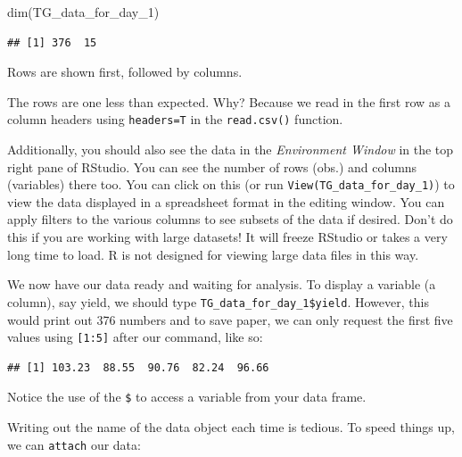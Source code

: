 \documentclass[
]{book}
\makeatletter
\newenvironment{Shaded}{\begin{snugshade}}{\end{snugshade}}
\newcommand{\DecValTok}[1]{\textcolor[rgb]{0.00,0.00,0.81}{#1}}
\newcommand{\FunctionTok}[1]{\textcolor[rgb]{0.00,0.00,0.00}{#1}}
\newcommand{\NormalTok}[1]{#1}
\newcommand{\SpecialCharTok}[1]{\textcolor[rgb]{0.00,0.00,0.00}{#1}}
\newenvironment{kframe}{%
\medskip{}
\setlength{\fboxsep}{.8em}
 \def\at@end@of@kframe{}%
 \ifinner\ifhmode%
  \def\at@end@of@kframe{\end{minipage}}%
  \begin{minipage}{\columnwidth}%
 \fi\fi%
 \def\FrameCommand##1{\hskip\@totalleftmargin \hskip-\fboxsep
 \colorbox{shadecolor}{##1}\hskip-\fboxsep
     \hskip-\linewidth \hskip-\@totalleftmargin \hskip\columnwidth}%
 \MakeFramed {\advance\hsize-\width
   \@totalleftmargin\z@ \linewidth\hsize
   \@setminipage}}%
 {\par\unskip\endMakeFramed%
 \at@end@of@kframe}
\newenvironment{rmdblock}[1]
  {
  \begin{itemize}
  \renewcommand{\labelitemi}{
    \raisebox{-.7\height}[0pt][0pt]{
      {\setkeys{Gin}{width=3em,keepaspectratio}\texttt{[image: images/\#1]}}
    }
  }
  \setlength{\fboxsep}{1em}
  \begin{kframe}
  \item
  }
  {
  \end{kframe}
  \end{itemize}
  }
\newenvironment{rmdcaution}
  {\begin{rmdblock}{caution}}
  {\end{rmdblock}}
\makeatother
\begin{document}
\begin{Shaded}
\begin{Highlighting}[]
\FunctionTok{dim}\NormalTok{(TG\_data\_for\_day\_1)}
\end{Highlighting}
\end{Shaded}

\begin{verbatim}
## [1] 376  15
\end{verbatim}

Rows are shown first, followed by columns.

\begin{rmdcaution}
The rows are one less than expected. Why? Because we read in the first row as a column headers using \texttt{headers=T} in the \texttt{read.csv()} function.
\end{rmdcaution}

Additionally, you should also see the data in the \emph{Environment Window} in the top right pane of RStudio. You can see the number of rows (obs.) and columns (variables) there too. You can click on this (or run \texttt{View(TG\_data\_for\_day\_1)}) to view the data displayed in a spreadsheet format in the editing window. You can apply filters to the various columns to see subsets of the data if desired. Don't do this if you are working with large datasets! It will freeze RStudio or takes a very long time to load. R is not designed for viewing large data files in this way.

We now have our data ready and waiting for analysis. To display a variable (a column), say yield, we should type \texttt{TG\_data\_for\_day\_1\$yield}. However, this would print out 376 numbers and to save paper, we can only request the first five values using \texttt{{[}1:5{]}} after our command, like so:

\begin{Shaded}
\end{Shaded}

\begin{verbatim}
## [1] 103.23  88.55  90.76  82.24  96.66
\end{verbatim}

Notice the use of the \texttt{\$} to access a variable from your data frame.

Writing out the name of the data object each time is tedious. To speed things up, we can \texttt{attach} our data:
\end{document}
